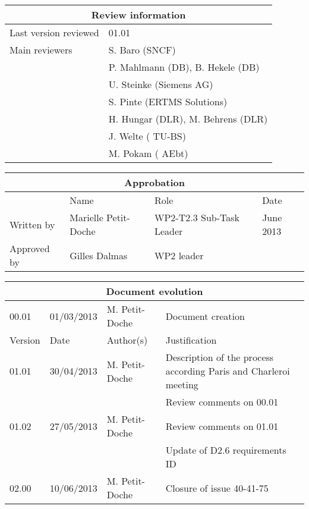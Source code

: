 \documentclass{template/openetcs_article}
\begin{document}
\begin{tabular}{|p{4.4cm}|p{8.7cm}|}
\hline
\multicolumn{2}{|c|}{Review information} \\
\hline
Last version reviewed & 01.01 \\
\hline
Main reviewers & S. Baro (SNCF) \\
& P. Mahlmann (DB), B. Hekele (DB)\\
& U. Steinke (Siemens AG) \\
& S. Pinte (ERTMS Solutions) \\
& H. Hungar (DLR), M. Behrens (DLR) \\
& J. Welte ( TU-BS) \\
& M. Pokam ( AEbt) \\
\hline
\end{tabular}

\begin{tabular}{|p{2.2cm}|p{4cm}|p{4cm}|p{2cm}|}
\hline
\multicolumn{4}{|c|}{Approbation} \\
\hline
  &  Name & Role & Date   \\
\hline  
Written by    &  Marielle Petit-Doche & WP2-T2.3 Sub-Task Leader  &  June 2013\\
\hline
Approved by & Gilles Dalmas & WP2 leader & \\
\hline
\end{tabular}

\begin{tabular}{|p{2.2cm}|p{2cm}|p{3cm}|p{5cm}|}
\hline
\multicolumn{4}{|c|}{Document evolution} \\
\hline
00.01 & 01/03/2013 & M. Petit-Doche &  Document creation  \\
Version &  Date & Author(s) & Justification  \\
\hline  
01.01 & 30/04/2013 & M. Petit-Doche &  Description of the process according Paris and Charleroi meeting  \\
& & & Review comments on 00.01 \\
\hline  
01.02 & 27/05/2013 & M. Petit-Doche &  Review comments on 01.01 \\
& & & Update of D2.6 requirements ID \\
\hline  
02.00 & 10/06/2013 & M. Petit-Doche &  Closure of issue 40-41-75 \\
\hline  
\end{tabular}



\newcommand{\tbd}{\colorbox{cyan}{\%\%To Be Defined\%\%}}
\newcommand{\tbc}{\colorbox{cyan}{\%\%To Be Confirmed\%\%}}
\newcommand{\todo}[1]{\colorbox{cyan}{\%\%{#1}\%\%}}
\newlength{\origindent}
\end{document}
